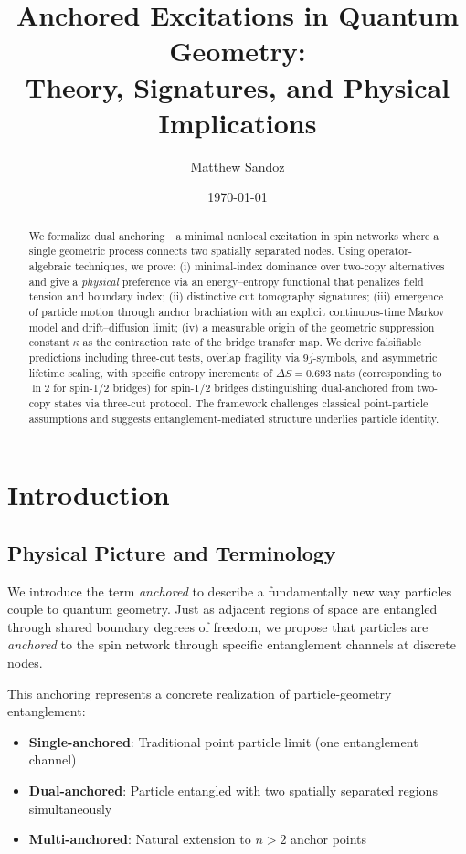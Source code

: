 \documentclass[11pt]{article}
\title{Anchored Excitations in Quantum Geometry: \\ Theory, Signatures, and Physical Implications}
\author{Matthew Sandoz}
\date{\today}
\theoremstyle{plain}
\theoremstyle{definition}
\begin{document}
\pagestyle{plain}
\maketitle

\begin{abstract}
  We formalize dual anchoring—a minimal nonlocal excitation in spin networks where a single geometric process
  connects two spatially separated nodes. Using operator-algebraic techniques,  we prove:
  (i) minimal-index dominance over two-copy alternatives and give a \emph{physical} preference via an energy--entropy functional
  that penalizes field tension and boundary index;
  (ii) distinctive cut tomography signatures;
  (iii) emergence of particle motion through anchor brachiation with an explicit continuous-time Markov model and drift–diffusion limit;
  (iv) a measurable origin of the geometric suppression constant $\kappa$ as the contraction rate of the
  bridge transfer map. We derive falsifiable predictions including three-cut tests, overlap fragility via $9j$-symbols,
  and asymmetric lifetime scaling, with specific entropy increments of $\Delta S = 0.693$ nats (corresponding to $\ln 2$ for spin-1/2 bridges) for spin-1/2 bridges distinguishing
  dual-anchored from two-copy states via three-cut protocol. The framework challenges classical point-particle assumptions and suggests
  entanglement-mediated structure underlies particle identity.
\end{abstract}

\section{Introduction}
\label{sec:intro}

\subsection{Physical Picture and Terminology}

We introduce the term \emph{anchored} to describe a fundamentally new way particles couple to quantum geometry. Just as adjacent regions of space are entangled through shared boundary degrees of freedom, we propose that particles are \emph{anchored} to the spin network through specific entanglement channels at discrete nodes.

This anchoring represents a concrete realization of particle-geometry entanglement:
\begin{itemize}
  \item \textbf{Single-anchored}: Traditional point particle limit (one entanglement channel)
  \item \textbf{Dual-anchored}: Particle entangled with two spatially separated regions simultaneously
  \item \textbf{Multi-anchored}: Natural extension to $n > 2$ anchor points
\end{itemize}
\end{document}
